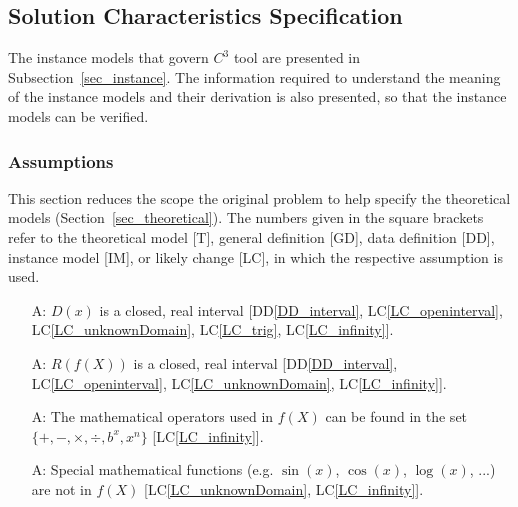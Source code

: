 \documentclass[12pt]{article}
\newcommand{\ddref}[1]{DD\ref{#1}}
\newcounter{assumpnum} %
\newcommand{\lcref}[1]{LC\ref{#1}}
\newcommand{\prognameAbbrv}{$C^{3}$}
\begin{document}
\subsection{Solution Characteristics Specification}
The instance models that govern \prognameAbbrv{} tool are presented in
Subsection~\ref{sec_instance}. The information required to understand the 
meaning of the instance models and their derivation is also presented, so that 
the instance models can be verified.

\subsubsection{Assumptions}
This section reduces the scope the original problem to help specify the 
theoretical models (Section~\ref{sec_theoretical}). The numbers given in the 
square brackets refer to the theoretical model [T], general definition [GD], 
data definition [DD], instance model [IM], or likely change [LC], in which the 
respective assumption is used.

\begin{itemize}

\item[A\refstepcounter{assumpnum}\theassumpnum \label{A_domain}:] $D(x)$ is a 
closed, real interval [\ddref{DD_interval}, \lcref{LC_openinterval}, 
\lcref{LC_unknownDomain}, \lcref{LC_trig}, \lcref{LC_infinity}]. 

\item[A\refstepcounter{assumpnum}\theassumpnum \label{A_interval}:] $R(f(X))$ 
is a closed, real interval [\ddref{DD_interval}, \lcref{LC_openinterval}, 
\lcref{LC_unknownDomain}, \lcref{LC_infinity}].

\item[A\refstepcounter{assumpnum}\theassumpnum \label{A_operators}:] The 
mathematical operators used in $f(X)$ can be found in the set $\{+, -, 
\times, \div, b^x, x^n \}$ [\lcref{LC_infinity}].

\item[A\refstepcounter{assumpnum}\theassumpnum \label{A_commonfunctions}:] 
Special mathematical functions (e.g. $\sin(x)$, $\cos(x)$, $\log(x)$, ...) are 
not in $f(X)$ [\lcref{LC_unknownDomain}, \lcref{LC_infinity}].

\end{itemize}

\end{document}
